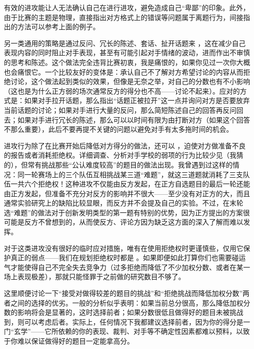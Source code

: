 \documentclass[a4paper,10pt,english]{sphinxmanual}
\begin{document}
有效的进攻能让人无法确认自己在进行进攻，避免造成自己“卑鄙”的印象。此外，由于比赛的主题是物理，直接指出对方格式上的错误等问题属于离题行为，间接指出的方法可以参考上面的例子。

另一类通用的策略是通过反问、冗长的陈述、套话、扯开话题来  ，这在减少自己表现内容的同时阻止对手表现，甚至有可能引起对手情绪的波动，进而作出不审慎的思考和陈述。这个做法完全违背比赛初衷，我是痛恨的，如果你见过一次你大概也会痛恨它。一个比较友好的变体是：承认自己不了解对方希望讨论的内容从而拒绝讨论，这个做法起到类似的效果，但像是无奈之举，对自己的分数也有不小影响（这也是为什么正方弱的场次通常反方的得分也不高——讨论不起来）。应对的方式是：如果对手拉开话题，那么指出“话题正被拉开”这一点并询问对方是否要放弃当前话题的讨论；如果对手进行大量的反问，那么简短陈述自己的回答再反问回去；如果对手进行冗长的陈述，那么可以以时间有限为由打断对方（如果这个回答不那么重要），此后不要再提不关键的问题以避免对手有太多拖时间的机会。

进攻行为除了在比赛开始后降低对方得分的做法，还可以  ，迫使对方做准备不良的报告或者消耗拒绝权。详细调查、分析对手学校的弱项的行为比较少见（我猜的），但常有挑战那些“公认难度较高”的题目的做法出现。我曾遇到过这样的情况：同一轮赛场上的三个队伍互相挑战某三道“难题”，就这三道题就消耗了三支队伍一共六个拒绝权！这种进攻不仅能由反方发起，在正方自选题目的最后一轮还能由正方发起，但准备不充分对反方的影响并不很大——至少没有对正方的大，而且通常实验研究上的缺陷比较显眼，而反方并不会提及自己的实验。不过，在末轮选“难题”的做法对于创新发明类型的第一题有特别的优势，因为正方提出的方案很可能是反方不曾想到的，从而使反方、评论方因为缺乏这方面的深入了解而难以发挥。

对于这类进攻没有很好的临时应对措施，唯有在使用拒绝权时更谨慎些，仅用它保护真正的弱点——我们在规划拒绝权时都是  。如果即便如此打算你们也需要碰运气才能使得自己不完全失去竞争力（过多拒绝而降低了不少加权分数、或者在某一场上表现极差），那就只能怪罪于之前做的研究数目不够了。

这里顺便讨论一下“接受对做得较差的题目的挑战”和“拒绝挑战而降低加权分数”两者之间的选择的优劣。一般的分析似乎表明：如果当前总分很高，那么降低加权分数的影响将会是显著的，这时选择前者；如果分数很低且做得好的题目未被挑战到，则可以考虑后者。实际上，任何情况下我都建议选择前者，因为你的得分是一门“玄学”——它所依赖的你的表现、裁判、对手等不确定性因素都难以预料，以致于你难以保证做得好的题目一定能拿高分。
\end{document}
